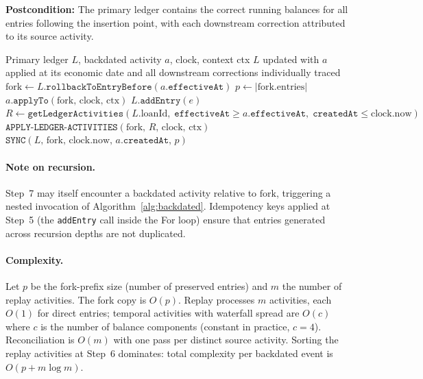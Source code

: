 \documentclass[11pt,letterpaper]{article}
\begin{document}
\textbf{Postcondition:} The primary ledger contains the correct running
balances for all entries following the insertion point, with each
downstream correction attributed to its source activity.

\begin{algorithm}[H]
\caption{Retroactive Fork-and-Sync for a Backdated Activity}
\label{alg:backdated}
\begin{algorithmic}[1]
\Require Primary ledger $L$, backdated activity $a$, clock, context ctx
\Ensure $L$ updated with $a$ applied at its economic date and all
        downstream corrections individually traced
\State $\text{fork} \leftarrow L.\texttt{rollbackToEntryBefore}(a.\texttt{effectiveAt})$
\State $p \leftarrow |\text{fork.entries}|$
\State $a.\texttt{applyTo}(\text{fork},\,\text{clock},\,\text{ctx})$
  \State $L.\texttt{addEntry}(e)$ 
\EndFor
\State $R \leftarrow \texttt{getLedgerActivities}(L.\text{loanId},\;
       \texttt{effectiveAt} \geq a.\texttt{effectiveAt},\;
       \texttt{createdAt} \leq \text{clock.now})$
\State $\texttt{APPLY-LEDGER-ACTIVITIES}(\text{fork},\,R,\,\text{clock},\,\text{ctx})$
\State $\texttt{SYNC}(L,\,\text{fork},\,\text{clock.now},\,
       a.\texttt{createdAt},\,p)$
\end{algorithmic}
\end{algorithm}

\paragraph{Note on recursion.}
Step~7 may itself encounter a backdated activity relative to
$\text{fork}$, triggering a nested invocation of
Algorithm~\ref{alg:backdated}. Idempotency keys applied at Step~5
(the \texttt{addEntry} call inside the For loop) ensure that entries
generated across recursion depths are not duplicated.

\paragraph{Complexity.}
Let $p$ be the fork-prefix size (number of preserved entries) and $m$
the number of replay activities. The fork copy is $O(p)$. Replay
processes $m$ activities, each $O(1)$ for direct entries; temporal
activities with waterfall spread are $O(c)$ where $c$ is the number of
balance components (constant in practice, $c = 4$). Reconciliation is
$O(m)$ with one pass per distinct source activity. Sorting the
replay activities at Step~6 dominates: total complexity per backdated
event is
$O(p + m \log m)$.
\end{document}

